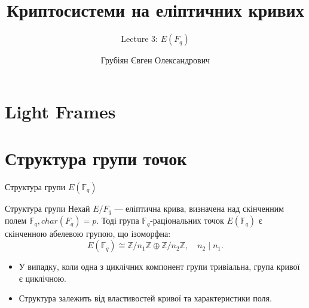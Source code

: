 \documentclass[9pt]{beamer}
\title{Криптосистеми на еліптичних кривих} %
\subtitle{Lecture 3: $E(F_q)$}
\author{Грубіян Євген Олександрович}
\begin{document}
  \frame{\maketitle}


  \begin{darkframes}
      
    \section{Light Frames}





\section{Структура групи точок}
\begin{frame}{Структура групи \(E(\mathbb{F}_q)\)}
  \begin{block}{Структура групи}
    Нехай \(E/F_q\) --- еліптична крива, визначена над скінченним полем \(\mathbb{F}_q, char(F_q)=p\). Тоді група \(\mathbb{F}_q\)-раціональних точок \(E(\mathbb{F}_q)\) є скінченною абелевою групою, що ізоморфна:
    \[
    E(\mathbb{F}_q) \cong \mathbb{Z}/n_1\mathbb{Z} \oplus \mathbb{Z}/n_2\mathbb{Z},\quad n_2 \mid n_1.
    \]
  \end{block}
  \vspace{0.3cm}
  \begin{itemize}
    \item У випадку, коли одна з циклічних компонент групи тривіальна, група кривої є циклічною.
    \item Структура залежить від властивостей кривої та характеристики поля.
  \end{itemize}
\end{frame}


\end{darkframes}
\end{document}
